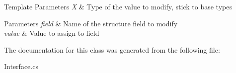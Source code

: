 \begin{DoxyTemplParams}{Template Parameters}
{\em X} & Type of the value to modify, stick to base types\\
\hline
\end{DoxyTemplParams}

\begin{DoxyParams}{Parameters}
{\em field} & Name of the structure field to modify\\
\hline
{\em value} & Value to assign to field\\
\hline
\end{DoxyParams}


The documentation for this class was generated from the following file\-:\begin{DoxyCompactItemize}
\item 
Interface.\-cs\end{DoxyCompactItemize}
